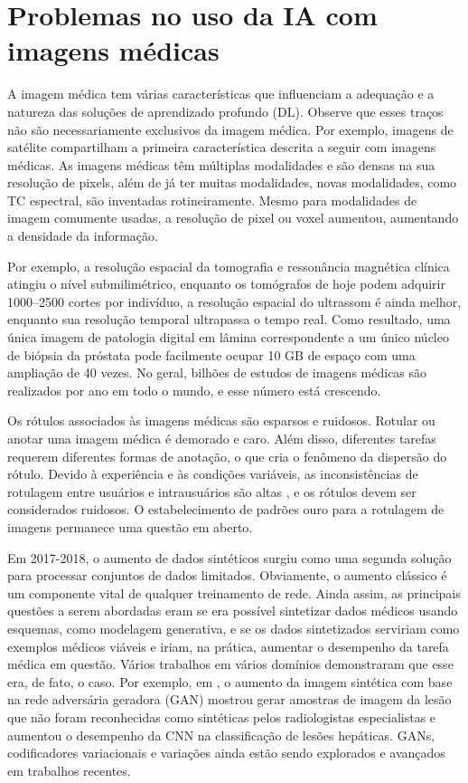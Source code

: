 \documentclass[
	12pt,				%
	openany,oneside,
	a4paper,			%
	english,			%
	brazil,				%
	]{abntex2}
\begin{document}
\section{Problemas no uso da IA com imagens médicas}

A imagem médica tem várias características que influenciam a adequação e a natureza das soluções de aprendizado profundo (DL). Observe que esses traços não são necessariamente exclusivos da imagem médica. Por exemplo, imagens de satélite compartilham a primeira característica descrita a seguir com imagens médicas. As imagens médicas têm múltiplas modalidades e são densas na sua resolução de pixels, além de já ter muitas modalidades, novas modalidades, como TC espectral, são inventadas rotineiramente. Mesmo para modalidades de imagem comumente usadas, a resolução de pixel ou voxel aumentou, aumentando a densidade da informação. 

Por exemplo, a resolução espacial da tomografia e ressonância magnética clínica atingiu o nível submilimétrico, enquanto os tomógrafos de hoje podem adquirir 1000–2500 cortes por indivíduo, a resolução espacial do ultrassom é ainda melhor, enquanto sua resolução temporal ultrapassa o tempo real. Como resultado, uma única imagem de patologia digital em lâmina correspondente a um único núcleo de biópsia da próstata pode facilmente ocupar 10 GB de espaço com uma ampliação de 40 vezes. No geral, bilhões de estudos de imagens médicas são realizados por ano em todo o mundo, e esse número está crescendo. 

Os rótulos associados às imagens médicas são esparsos e ruidosos. Rotular ou anotar uma imagem médica é demorado e caro. Além disso, diferentes tarefas requerem diferentes formas de anotação, o que cria o fenômeno da dispersão do rótulo. Devido à experiência e às condições variáveis, as inconsistências de rotulagem entre usuários e intrausuários são altas \cite{c2}, e os rótulos devem ser considerados ruidosos. O estabelecimento de padrões ouro para a rotulagem de imagens permanece uma questão em aberto.

Em 2017-2018, o aumento de dados sintéticos surgiu como uma segunda solução para processar conjuntos de dados limitados. Obviamente, o aumento clássico é um componente vital de qualquer treinamento de rede. Ainda assim, as principais questões a serem abordadas eram se era possível sintetizar dados médicos usando esquemas, como modelagem generativa, e se os dados sintetizados serviriam como exemplos médicos viáveis e iriam, na prática, aumentar o desempenho da tarefa médica em questão. Vários trabalhos em vários domínios demonstraram que esse era, de fato, o caso. 
Por exemplo, em \cite{c8}, o aumento da imagem sintética com base na rede adversária geradora (GAN) mostrou gerar amostras de imagem da lesão que não foram reconhecidas como sintéticas pelos radiologistas especialistas e aumentou o desempenho da CNN na classificação de lesões hepáticas. GANs, codificadores variacionais e variações ainda estão sendo explorados e avançados em trabalhos recentes.
\end{document}
